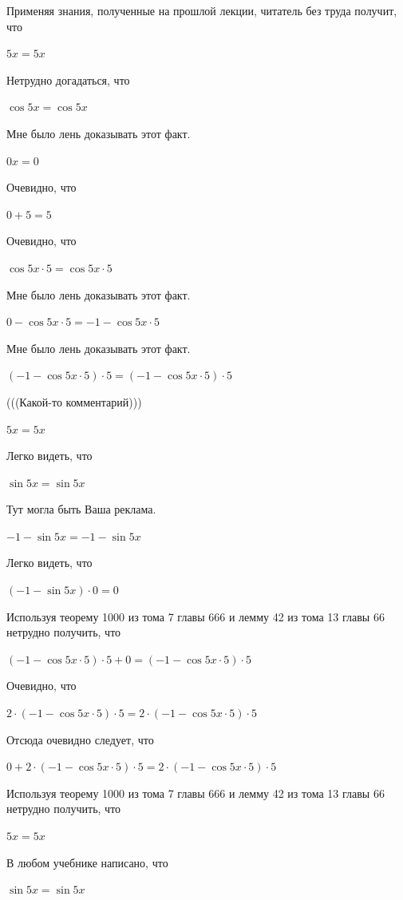 \documentclass[12pt,a4paper,fleqn]{article}
\theoremstyle{definition}
\begin{document}
Применяя знания, полученные на прошлой лекции, читатель без труда получит, что 

$ 5  x  =  5  x $

Нетрудно догадаться, что 

$\cos 5  x  = \cos 5  x $

Мне было лень доказывать этот факт.

$ 0  x  =  0 $

Очевидно, что 

$ 0  +  5  =  5 $

Очевидно, что 

$\cos 5  x  \cdot  5  = \cos 5  x  \cdot  5 $

Мне было лень доказывать этот факт.

$ 0  - \cos 5  x  \cdot  5  =  -1  - \cos 5  x  \cdot  5 $

Мне было лень доказывать этот факт.

$( -1  - \cos 5  x  \cdot  5 ) \cdot  5  = ( -1  - \cos 5  x  \cdot  5 ) \cdot  5 $

(((Какой-то комментарий))) 

$ 5  x  =  5  x $

Легко видеть, что 

$\sin 5  x  = \sin 5  x $

Тут могла быть Ваша реклама. 

$ -1  - \sin 5  x  =  -1  - \sin 5  x $

Легко видеть, что 

$( -1  - \sin 5  x ) \cdot  0  =  0 $

Используя теорему 1000 из тома 7 главы 666 и лемму 42 из тома 13 главы 66 нетрудно получить, что 

$( -1  - \cos 5  x  \cdot  5 ) \cdot  5  +  0  = ( -1  - \cos 5  x  \cdot  5 ) \cdot  5 $

Очевидно, что 

$ 2  \cdot ( -1  - \cos 5  x  \cdot  5 ) \cdot  5  =  2  \cdot ( -1  - \cos 5  x  \cdot  5 ) \cdot  5 $

Отсюда очевидно следует, что 

$ 0  +  2  \cdot ( -1  - \cos 5  x  \cdot  5 ) \cdot  5  =  2  \cdot ( -1  - \cos 5  x  \cdot  5 ) \cdot  5 $

Используя теорему 1000 из тома 7 главы 666 и лемму 42 из тома 13 главы 66 нетрудно получить, что 

$ 5  x  =  5  x $

В любом учебнике написано, что 

$\sin 5  x  = \sin 5  x $
\end{document}
